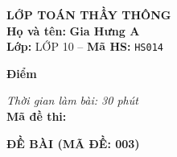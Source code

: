 \noindent
\begin{tcolorbox}[colback=white,colframe=black,arc=0mm,boxrule=0.8pt,top=4pt,bottom=4pt,left=6pt,right=6pt]
	\begin{minipage}[c]{0.44\textwidth}
		{\bfseries\large LỚP TOÁN THẦY THÔNG}\\[3pt]
		\textbf{Họ và tên:} \textbf{\large Gia Hưng A}\\[3pt]
		\textbf{Lớp:} LỚP 10 \quad -- \quad \textbf{Mã HS:} \texttt{HS014}
	\end{minipage}
	\hfill
	\begin{minipage}[c]{0.22\textwidth}
		\begin{tcolorbox}[colback=white,colframe=black,arc=0mm,boxrule=0.6pt,height=1.8cm,halign=center,valign=top,top=2pt]
			{\bfseries\normalsize Điểm}
		\end{tcolorbox}
	\end{minipage}
	\hfill
	\begin{minipage}[c]{0.30\textwidth}
		\raggedleft
		\textit{Thời gian làm bài: 30 phút}\\[4pt]
		\textbf{Mã đề thi:} 
	\end{minipage}
\end{tcolorbox}
\vspace{0.25cm}

\noindent\textbf{\large ĐỀ BÀI (MÃ ĐỀ: 003)}
\vspace{0.1cm}

